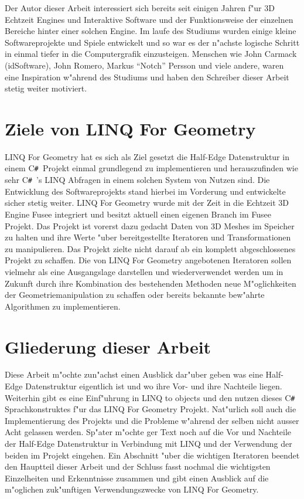\documentclass[pagesize, paper=a4, fontsize=12pt,titlepage=true, headings=small, headnosepline, abstractoff, liststotoc, nochapterprefix, plainheadsepline]{scrreprt}
\newcommand{\CSS}{C\texttt{\# }}
\newcommand{\LFG}{LINQ For Geometry}
\newcommand{\LFGS}{LINQ For Geometry }
\newcommand{\LQ}{ LINQ }
\newcommand{\HES}{Half-Edge Datenstruktur }
\begin{document}
Der Autor dieser Arbeit interessiert sich bereits seit einigen Jahren f"ur 3D Echtzeit Engines und Interaktive Software und der Funktionsweise der einzelnen Bereiche hinter einer solchen Engine. Im laufe des Studiums wurden einige kleine Softwareprojekte und Spiele entwickelt und so war es der n"achste logische Schritt in einmal tiefer in die Computergrafik einzusteigen. Menschen wie John Carmack (idSoftware), John Romero, Markus "`Notch"' Persson und viele andere, waren eine Inspiration w"ahrend des Studiums und haben den Schreiber dieser Arbeit stetig weiter motiviert.
	
	\section {Ziele von \LFG}
	\LFGS hat es sich als Ziel gesetzt die \HES in einem \CSS Projekt einmal grundlegend zu implementieren und herauszufinden wie sehr \CSS's LINQ Abfragen in einem solchen System von Nutzen sind. Die Entwicklung des Softwareprojekts stand hierbei im Vorderung und entwickelte sicher stetig weiter. \LFGS wurde mit der Zeit in die Echtzeit 3D Engine Fusee integriert und besitzt aktuell einen eigenen Branch im Fusee Projekt. Das Projekt ist vorerst dazu gedacht Daten von 3D Meshes im Speicher zu halten und ihre Werte "uber bereitgestellte Iteratoren und Transformationen zu manipulieren. Das Projekt zielte nicht darauf ab ein komplett abgeschlossenes Projekt zu schaffen. Die von \LFGS angebotenen Iteratoren sollen vielmehr als eine Ausgangslage darstellen und wiederverwendet werden um in Zukunft durch ihre Kombination des bestehenden Methoden neue M"oglichkeiten der Geometriemanipulation zu schaffen oder bereits bekannte bew"ahrte Algorithmen zu implementieren.
	\section{Gliederung dieser Arbeit}
	Diese Arbeit m"ochte zun"achst einen Ausblick dar"uber geben was eine \HES eigentlich ist und wo ihre Vor- und ihre Nachteile liegen. Weiterhin gibt es eine Einf"uhrung in LINQ to objects und den nutzen dieses \CSS Sprachkonstruktes f"ur das \LFGS Projekt. Nat"urlich soll auch die Implementierung des Projekts und die Probleme w"ahrend der selben nicht ausser Acht gelassen werden. Sp"ater m"ochte ger Text noch auf die Vor und Nachteile der \HES in Verbindung mit LINQ und der Verwendung der beiden im Projekt eingehen. Ein Abschnitt "uber die wichtigen Iteratoren beendet den Hauptteil dieser Arbeit und der Schluss fasst nochmal die wichtigsten Einzelheiten und Erkenntnisse zusammen und gibt einen Ausblick auf die m"oglichen zuk"unftigen Verwendungszwecke von \LFG.
\end{document}
